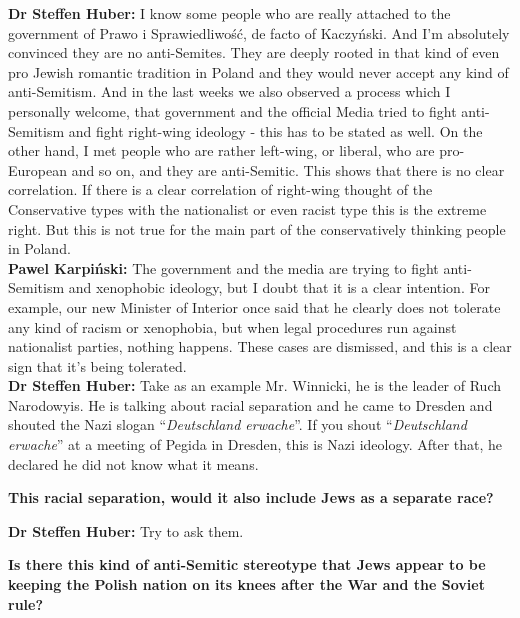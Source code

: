 \textbf{Dr Steffen Huber:} I know some people who are really attached to the government of Prawo i Sprawiedliwość, de facto of Kaczyński. And I'm absolutely convinced they are no anti-Semites. They are deeply rooted in that kind of even pro Jewish romantic tradition in Poland and they would never accept any kind of anti-Semitism. And in the last weeks we also observed a process which I personally welcome, that government and the official Media tried to fight anti-Semitism and fight right-wing ideology - this has to be stated as well. On the other hand, I met people who are rather left-wing, or liberal, who are pro-European and so on, and they are anti-Semitic. This shows that there is no clear correlation. If there is a clear correlation of right-wing thought of the Conservative types with the nationalist or even racist type this is the extreme right. But this is not true for the main part of the conservatively thinking people in Poland. \\
\textbf{Pawel Karpiński:} The government and the media are trying to fight anti-Semitism and xenophobic ideology, but I doubt that it is a clear intention. For example, our new Minister of Interior once said that he clearly does not tolerate any kind of racism or xenophobia, but when legal procedures run against nationalist parties, nothing happens. These cases are dismissed, and this is a clear sign that it’s being tolerated.\\ 
\textbf{Dr Steffen Huber:} Take as an example Mr. Winnicki, he is the leader of Ruch Narodowyis. He is talking about racial separation and he came to Dresden and shouted the Nazi slogan “\textit{Deutschland erwache}”. If you shout “\textit{Deutschland erwache}” at a meeting of Pegida in Dresden, this is Nazi ideology. After that, he declared he did not know what it means.  

\textbf{This racial separation, would it also include Jews as a separate race?}

\textbf{Dr Steffen Huber:} Try to ask them.  

\textbf{Is there this kind of anti-Semitic stereotype that Jews appear to be keeping the Polish nation on its knees after the War and the Soviet rule?} 

